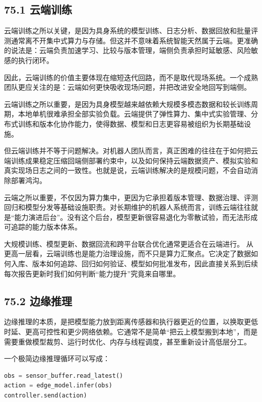 \subsection*{75.1 云端训练}


云端训练之所以关键，是因为具身系统的模型训练、日志分析、数据回放和批量评测通常离不开集中式算力与存储。但这并不意味着系统智能天然属于云端。更准确的说法是：云端负责加速学习、比较与版本管理，端侧负责承担时延敏感、风险敏感的执行闭环。

因此，云端训练的价值主要体现在缩短迭代回路，而不是取代现场系统。一个成熟团队更应关注的是：云端如何更快吸收现场问题，并把改进安全地回写到端侧。

云端训练之所以重要，是因为具身模型越来越依赖大规模多模态数据和较长训练周期，本地单机很难承担全部实验负载。云端提供了弹性算力、集中式实验管理、分布式训练和版本化协作能力，使得数据、模型和日志更容易被组织为长期基础设施。

但云端训练并不等于问题解决。对机器人团队而言，真正困难的往往在于如何把云端训练成果稳定压缩回端侧部署约束中，以及如何保持云端数据资产、模拟实验和真实现场日志之间的一致性。也就是说，云端训练解决的是规模问题，不会自动消除部署鸿沟。

云端之所以重要，不仅因为算力集中，更因为它承担着版本管理、数据治理、评测回归和模型分发等基础设施职责。对长期维护的机器人系统而言，训练云端往往就是“能力演进后台”。没有这个后台，模型更新很容易退化为零散试验，而无法形成可追踪的能力版本体系。

大规模训练、模型更新、数据回流和跨平台联合优化通常更适合在云端进行。 从更高一层看，云端训练也是能力治理设施，而不只是算力汇聚点。它决定了数据如何入库、版本如何追踪、回归如何验证、模型如何批准发布，因此直接关系到后续每次报告更新时我们如何判断“能力提升”究竟来自哪里。

\subsection*{75.2 边缘推理}


边缘推理的本质，是把模型能力放到距离传感器和执行器更近的位置，以换取更低时延、更高可控性和更少网络依赖。它通常不是简单“把云上模型搬到本地”，而是需要重做模型裁剪、运行时优化、内存与线程调度，甚至重新设计高低层分工。

一个极简边缘推理循环可以写成：

\begin{lstlisting}[language=python]
obs = sensor_buffer.read_latest()
action = edge_model.infer(obs)
controller.send(action)
\end{lstlisting}

